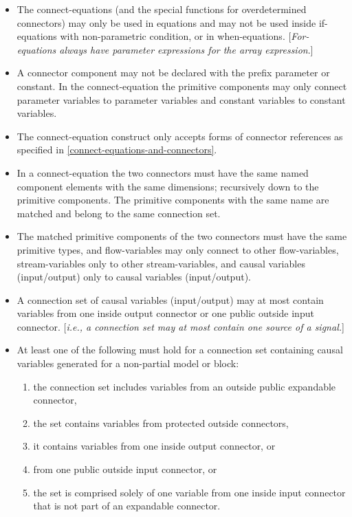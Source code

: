 \documentclass[10pt,a4paper]{report}
\begin{document}
\begin{itemize}
\item
  The connect-equations (and the special functions for overdetermined
  connectors) may only be used in equations and may not be used inside
  if-equations with non-parametric condition, or in when-equations.
  {[}\emph{For-equations always have parameter expressions for the array
  expression}.{]}
\item
  A connector component may not be declared with the prefix parameter or
  constant. In the connect-equation the primitive components may only
  connect parameter variables to parameter variables and constant
  variables to constant variables.
\item
  The connect-equation construct only accepts forms of connector
  references as specified in \ref{connect-equations-and-connectors}.
\item
  In a connect-equation the two connectors must have the same named
  component elements with the same dimensions; recursively down to the
  primitive components. The primitive components with the same name are
  matched and belong to the same connection set.
\item
  The matched primitive components of the two connectors must have the
  same primitive types, and flow-variables may only connect to other
  flow-variables, stream-variables only to other stream-variables, and
  causal variables (input/output) only to causal variables
  (input/output).
\item
  A connection set of causal variables (input/output) may at most
  contain variables from one inside output connector or one public
  outside input connector. {[}\emph{i.e., a connection set may at most
  contain one source of a signal.}{]}
\item
  At least one of the following must hold for a connection set
  containing causal variables generated for a non-partial model or
  block:
\begin{enumerate}
\item the connection set includes variables from an outside public
  expandable connector, 
\item the set contains variables from protected
  outside connectors, 
\item it contains variables from one inside output
  connector, or 
\item from one public outside input connector, or 
\item the  set is comprised solely of one variable from one inside input
  connector that is not part of an expandable connector. \label{exc-conn-case}

\end{enumerate}
\end{itemize}
\end{document}
